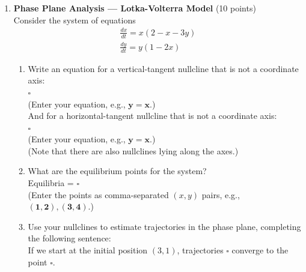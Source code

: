 \begin{enumerate}
  \item \textbf{Phase Plane Analysis --- Lotka-Volterra Model} (10 points)\\
  Consider the system of equations
  $$
  \begin{gathered}
  \frac{d x}{d t}=x(2-x-3 y) \\
  \frac{d y}{d t}=y(1-2 x)
  \end{gathered}
  $$
  \begin{enumerate}[label=(\alph*)]
    \item Write an equation for a vertical-tangent nullcline that is not a coordinate axis:\\
    $\square$\\
    (Enter your equation, e.g., $\boldsymbol{y}=\boldsymbol{x}$.)\\
    And for a horizontal-tangent nullcline that is not a coordinate axis:\\
    $\square$\\
    (Enter your equation, e.g., $\boldsymbol{y}=\boldsymbol{x}$.)\\
    (Note that there are also nullclines lying along the axes.)\\
    \begin{subanswer}
    \end{subanswer}
    \item What are the equilibrium points for the system?\\
    Equilibria = $\square$\\
    (Enter the points as comma-separated $(x, y)$ pairs, e.g., $(\mathbf{1 , 2}),(\mathbf{3 , 4})$.)\\
    \begin{subanswer}
    \end{subanswer}
    \item Use your nullclines to estimate trajectories in the phase plane, completing the following sentence:\\
    If we start at the initial position $(3,1)$, trajectories $\square$ converge to the point $\square$.\\
    \begin{subanswer}
    \end{subanswer}
  \end{enumerate}

  \newpage


\end{enumerate}
